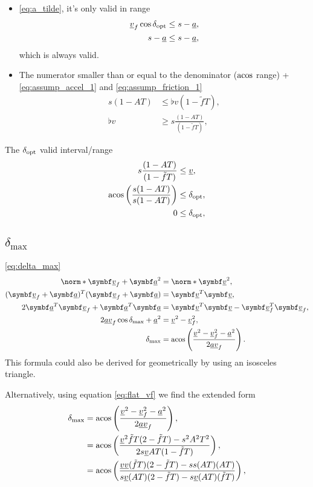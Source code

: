 \begin{itemize}
\item
\eqref{eq:a_tilde}, it's only valid in range
\begin{align*}
\flat{v}_f \cos\delta_{\opt} &\le s - \flat{a},\\
s - \flat{a}&\le s - \flat{a},
\end{align*}
which is always valid.

\item
The numerator smaller than or equal to the denominator ($\operatorname{acos}$ range) + \eqref{eq:assump_accel_1} and \eqref{eq:assump_friction_1}
\begin{align*}
s (1 - AT) &\le \flat{v}(1 - \tilde{f}T),\\
\flat{v} &\ge s \frac{(1 - AT)}{(1 - \tilde{f}T)},
\end{align*}
\end{itemize}

The $\delta_{\operatorname{opt}}$ valid interval/range
\begin{align*}
s \frac{(1 - AT)}{(1 - \tilde{f}T)} &\le \flat{v},\\
\acos\left( \frac{s(1 - AT)}{s(1 - AT)} \right) &\le \delta_{\opt},\\
0 &\le \delta_{\opt},
\end{align*}


\subsection{\texorpdfstring{$\delta_{\max}$}{delta\_max}}
\label{app:derive_delta_max}
\eqref{eq:delta_max}
\begin{align*}
\norm*{\vec{\flat{v}}_f + \vec{\flat{a}}}^2 &= \norm*{\vec{\flat{v}}}^2,\\
(\vec{\flat{v}}_f + \vec{\flat{a}})^T (\vec{\flat{v}}_f + \vec{\flat{a}}) &= \vec{\flat{v}}^T \vec{\flat{v}},\\
2 \vec{\flat{a}}^T \vec{\flat{v}}_f + \vec{\flat{a}}^T \vec{\flat{a}} &= \vec{\flat{v}}^T \vec{\flat{v}} - \vec{\flat{v}}_f^T \vec{\flat{v}}_f,\\
2 \flat{a} \flat{v}_f \cos\delta_{\max} + \flat{a}^2 &= \flat{v}^2 - \flat{v}_f^2,\\
\delta_{\max} &= \acos\left( \frac{\flat{v}^2 - \flat{v}_f^2 - \flat{a}^2}{2 \flat{a} \flat{v}_f} \right).
\end{align*}
This formula could also be derived for geometrically by using an isosceles triangle.

Alternatively, using equation \eqref{eq:flat_vf} we find the extended form
\begin{align*}
\delta_{\max} &= \acos\left( \frac{\flat{v}^2 - \flat{v}_f^2 - \flat{a}^2}{2 \flat{a} \flat{v}_f} \right),\\
&= \acos\left( \frac{\flat{v}^2 \tilde{f}T(2 - \tilde{f}T) - s^2 A^2 T^2}{2 s \flat{v} AT(1 - \tilde{f}T)} \right),\\
&= \acos\left( \frac{\flat{v} \flat{v} (\tilde{f}T)(2 - \tilde{f}T) - ss (AT)(AT)}{s \flat{v} (AT)(2 - \tilde{f}T) - s \flat{v} (AT)(\tilde{f}T)} \right),
\end{align*}

